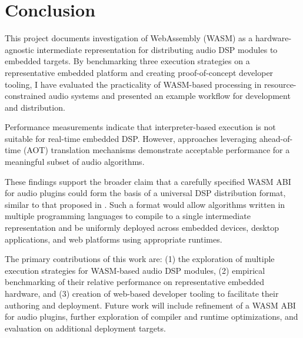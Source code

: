 \chapter{ Conclusion }

This project documents investigation of WebAssembly (WASM) as a hardware-agnostic intermediate representation for distributing audio DSP modules to embedded targets. By benchmarking three execution strategies on a representative embedded platform and creating proof-of-concept developer tooling, I have evaluated the practicality of WASM-based processing in resource-constrained audio systems and presented an example workflow for development and distribution.

Performance measurements indicate that interpreter-based execution is not suitable for real-time embedded DSP. However, approaches leveraging ahead-of-time (AOT) translation mechanisms demonstrate acceptable performance for a meaningful subset of audio algorithms.

These findings support the broader claim that a carefully specified WASM ABI for audio plugins could form the basis of a universal DSP distribution format, similar to that proposed in \cite{gaster2020audio}. Such a format would allow algorithms written in multiple programming languages to compile to a single intermediate representation and be uniformly deployed across embedded devices, desktop applications, and web platforms using appropriate runtimes.

The primary contributions of this work are: (1) the exploration of multiple execution strategies for WASM-based audio DSP modules, (2) empirical benchmarking of their relative performance on representative embedded hardware, and (3) creation of web-based developer tooling to facilitate their authoring and deployment. Future work will include refinement of a WASM ABI for audio plugins, further exploration of compiler and runtime optimizations, and evaluation on additional deployment targets.
